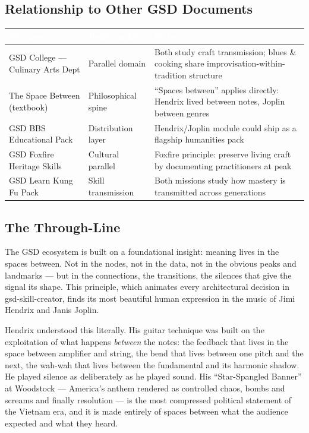 \documentclass[11pt,letterpaper]{article}
\newcommand{\tableheader}[1]{\textbf{\sffamily\textcolor{white}{#1}}}
\begin{document}
\subsection{Relationship to Other GSD Documents}

\begin{center}
\begin{tabularx}{\textwidth}{L{4cm}L{3cm}X}
\toprule
{}
\tableheader{Document} & \tableheader{Relationship} & \tableheader{Notes} \\
\midrule
GSD College --- Culinary Arts Dept & Parallel domain & Both study craft transmission; blues \& cooking share improvisation-within-tradition structure \\
The Space Between (textbook) & Philosophical spine & ``Spaces between'' applies directly: Hendrix lived between notes, Joplin between genres \\
GSD BBS Educational Pack & Distribution layer & Hendrix/Joplin module could ship as a flagship humanities pack \\
GSD Foxfire Heritage Skills & Cultural parallel & Foxfire principle: preserve living craft by documenting practitioners at peak \\
GSD Learn Kung Fu Pack & Skill transmission & Both missions study how mastery is transmitted across generations \\
\bottomrule
\end{tabularx}
\end{center}

\subsection{The Through-Line}

The GSD ecosystem is built on a foundational insight: meaning lives in the spaces between. Not in the nodes, not in the data, not in the obvious peaks and landmarks --- but in the connections, the transitions, the silences that give the signal its shape. This principle, which animates every architectural decision in gsd-skill-creator, finds its most beautiful human expression in the music of Jimi Hendrix and Janis Joplin.

Hendrix understood this literally. His guitar technique was built on the exploitation of what happens \textit{between} the notes: the feedback that lives in the space between amplifier and string, the bend that lives between one pitch and the next, the wah-wah that lives between the fundamental and its harmonic shadow. He played silence as deliberately as he played sound. His ``Star-Spangled Banner'' at Woodstock --- America's anthem rendered as controlled chaos, bombs and screams and finally resolution --- is the most compressed political statement of the Vietnam era, and it is made entirely of spaces between what the audience expected and what they heard.
\end{document}
